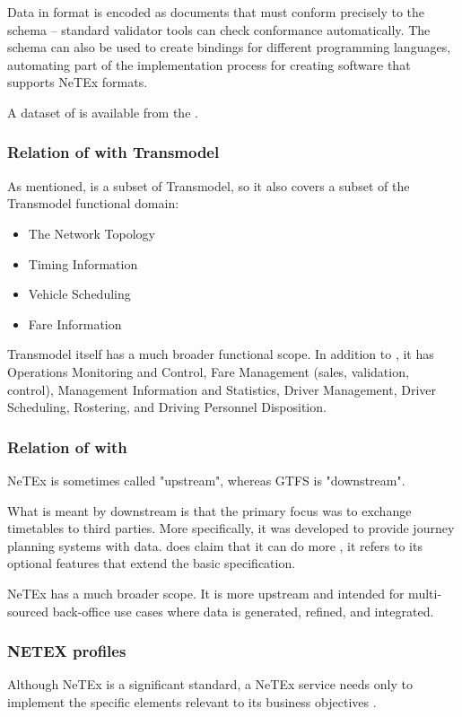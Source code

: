 Data in  format is encoded as  documents that must conform precisely to the schema – standard  validator tools can check conformance automatically. The schema can also be used to create bindings for different
programming languages, automating part of the implementation process for creating software that supports NeTEx
formats. 

A dataset of  is available from the  \cite{noauthor_use_nodate}. 

\subsubsection{Relation of  with Transmodel}
As mentioned,  is a subset of Transmodel, so it also covers a subset of the Transmodel functional domain:
\begin{itemize}
    \item The Network Topology
    \item Timing Information
    \item Vehicle Scheduling
    \item Fare Information
\end{itemize}
Transmodel itself has a much broader functional scope. In addition to , it has Operations Monitoring and Control, Fare Management (sales, validation, control), Management Information
and Statistics, Driver Management, Driver Scheduling, Rostering, and Driving Personnel Disposition.
\subsubsection{Relation of  with }

NeTEx is sometimes called "upstream", whereas GTFS is "downstream".

What is meant by downstream is that the primary focus  was to exchange timetables to third parties. More specifically, it was developed to provide journey planning systems with data.  does claim that it can do more \cite{noauthor_general_nodate}, it refers to its optional features that extend the basic specification.

NeTEx has a much broader scope. It is more upstream and intended for multi-sourced back-office use cases where data is generated, refined, and integrated.
\subsubsection{NETEX profiles}
Although NeTEx is a significant standard, a NeTEx service needs only to implement the specific elements relevant to its business objectives \cite{noauthor_what_nodate}. 

